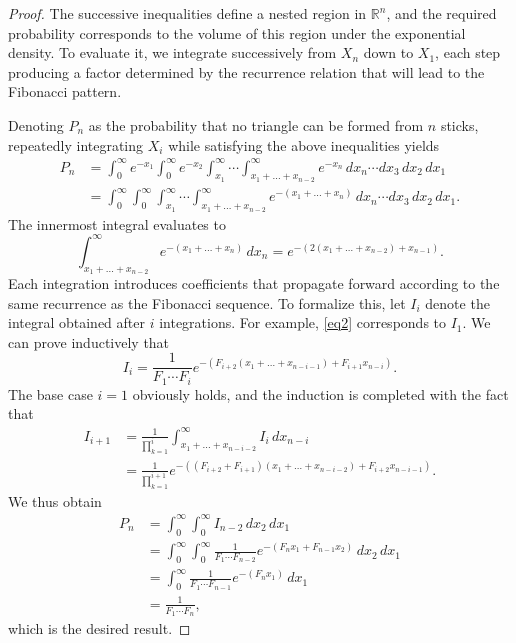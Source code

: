 \documentclass{amsart}
\begin{document}
\begin{proof}
  The successive inequalities define a nested region in $\mathbb{R}^n$, and the required probability corresponds to the volume of this region under the exponential density.
  To evaluate it, we integrate successively from $X_n$ down to $X_1$, each step producing a factor determined by the recurrence relation that will lead to the Fibonacci pattern.

  Denoting $P_n$ as the probability that no triangle can be formed from $n$ sticks, repeatedly integrating $X_i$ while satisfying the above inequalities yields
  \begin{align*}
    P_n &= \int_{0}^{\infty} e^{-x_1} \int_{0}^{\infty} e^{-x_2} \int_{x_1}^{\infty} \dotsi \int_{x_1 + \dots + x_{n-2}}^{\infty} e^{-x_n} \, dx_n \cdots dx_{3}\, dx_2\, dx_1 \\
        &= \int_{0}^{\infty} \int_{0}^{\infty}\int_{x_1}^{\infty} \dotsi \int_{x_1 + \dots + x_{n-2}}^{\infty} e^{-(x_1 + \dots + x_n)} \, dx_n \cdots dx_{3}\, dx_2\, dx_1.
  \end{align*}
  The innermost integral evaluates to
  \begin{equation}\label{eq2}
    \int_{x_1 + \dots + x_{n-2}}^{\infty} e^{-(x_1 + \dots + x_n)}\, dx_n = e^{-(2(x_1 + \dots + x_{n-2}) + x_{n-1})} 
    .
  \end{equation}
  Each integration introduces coefficients that propagate forward according to the same recurrence as the Fibonacci sequence. To formalize this, let $I_i$ denote the integral obtained after $i$ integrations. For example, \eqref{eq2} corresponds to $I_1$. We can prove inductively that \[
    I_{i} = \frac{1}{F_{1} \cdots F_i}e^{-(F_{i+2}(x_1 + \dots + x_{n-i-1}) + F_{i+1}x_{n-i})}.
  \] The base case $i=1$ obviously holds, and the induction is completed with the fact that 
  \begin{align*}
    I_{i+1} &= \frac{1}{\prod_{k=1}^{i}}\int_{x_1 + \dots + x_{n-i-2}}^{\infty} I_{i} \, dx_{n-i} \\
            &= \frac{1}{\prod_{k = 1}^{i+1}} e^{-((F_{i+2}+F_{i+1})(x_1 + \dots + x_{n-i-2}) + F_{i+2}x_{n-i-1})}.
  \end{align*}
  We thus obtain
  \begin{align*}
    P_n &= \int_{0}^{\infty} \int_{0}^{\infty} I_{n-2}\, dx_2 \, dx_1 \\
        &= \int_{0}^{\infty} \int_{0}^{\infty} \frac{1}{F_1 \cdots F_{n - 2}} e^{-(F_{n}x_1 + F_{n-1} x_{2})} \, dx_2\, dx_1 \\
        &= \int_{0}^{\infty} \frac{1}{F_1 \cdots F_{n-1}} e^{-(F_nx_1)}\, dx_1 \\
        &= \frac{1}{F_1 \cdots F_n},
  \end{align*}
  which is the desired result. 
\end{proof}
\end{document}

